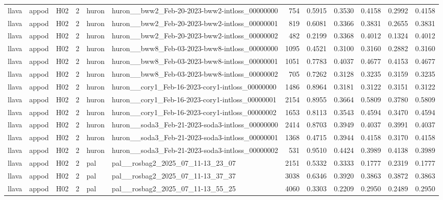 \begin{table}[tbp]
\begin{tabular}{lllrllrrrrrr}
llava & appod & H02 & 2 & huron & huron\_\_bww2\_Feb-20-2023-bww2-intloss\_00000000 & 754 & 0.5915 & 0.3530 & 0.4158 & 0.2992 & 0.4158 \\
llava & appod & H02 & 2 & huron & huron\_\_bww2\_Feb-20-2023-bww2-intloss\_00000001 & 819 & 0.6081 & 0.3366 & 0.3831 & 0.2655 & 0.3831 \\
llava & appod & H02 & 2 & huron & huron\_\_bww2\_Feb-20-2023-bww2-intloss\_00000002 & 482 & 0.2199 & 0.3368 & 0.4012 & 0.1324 & 0.4012 \\
llava & appod & H02 & 2 & huron & huron\_\_bww8\_Feb-03-2023-bww8-intloss\_00000000 & 1095 & 0.4521 & 0.3100 & 0.3160 & 0.2882 & 0.3160 \\
llava & appod & H02 & 2 & huron & huron\_\_bww8\_Feb-03-2023-bww8-intloss\_00000001 & 1051 & 0.7783 & 0.4037 & 0.4677 & 0.4153 & 0.4677 \\
llava & appod & H02 & 2 & huron & huron\_\_bww8\_Feb-03-2023-bww8-intloss\_00000002 & 705 & 0.7262 & 0.3128 & 0.3235 & 0.3159 & 0.3235 \\
llava & appod & H02 & 2 & huron & huron\_\_cory1\_Feb-16-2023-cory1-intloss\_00000000 & 1486 & 0.8964 & 0.3181 & 0.3122 & 0.3151 & 0.3122 \\
llava & appod & H02 & 2 & huron & huron\_\_cory1\_Feb-16-2023-cory1-intloss\_00000001 & 2154 & 0.8955 & 0.3664 & 0.5809 & 0.3780 & 0.5809 \\
llava & appod & H02 & 2 & huron & huron\_\_cory1\_Feb-16-2023-cory1-intloss\_00000002 & 1653 & 0.8113 & 0.3543 & 0.4594 & 0.3470 & 0.4594 \\
llava & appod & H02 & 2 & huron & huron\_\_soda3\_Feb-21-2023-soda3-intloss\_00000000 & 2414 & 0.8703 & 0.3949 & 0.4037 & 0.3991 & 0.4037 \\
llava & appod & H02 & 2 & huron & huron\_\_soda3\_Feb-21-2023-soda3-intloss\_00000001 & 1368 & 0.4715 & 0.3944 & 0.4158 & 0.3170 & 0.4158 \\
llava & appod & H02 & 2 & huron & huron\_\_soda3\_Feb-21-2023-soda3-intloss\_00000002 & 531 & 0.9510 & 0.4424 & 0.3989 & 0.4138 & 0.3989 \\
llava & appod & H02 & 2 & pal & pal\_\_rosbag2\_2025\_07\_11-13\_23\_07 & 2151 & 0.5332 & 0.3333 & 0.1777 & 0.2319 & 0.1777 \\
llava & appod & H02 & 2 & pal & pal\_\_rosbag2\_2025\_07\_11-13\_37\_37 & 3038 & 0.6346 & 0.3920 & 0.3863 & 0.3872 & 0.3863 \\
llava & appod & H02 & 2 & pal & pal\_\_rosbag2\_2025\_07\_11-13\_55\_25 & 4060 & 0.3303 & 0.2209 & 0.2950 & 0.2489 & 0.2950 \\

\end{tabular}
\end{table}
